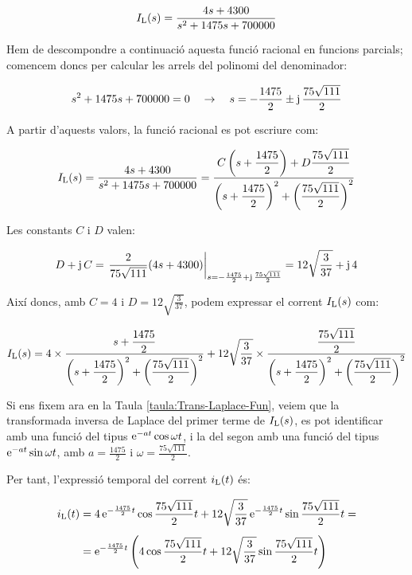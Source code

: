 \begin{exemple}
    \[
    I_\mathrm{L}(s) = \frac{4 s+ 4300}{s^2 +1475 s + 700000}
    \]

    Hem de descompondre a continuació aquesta funció racional en
    funcions parcials; comencem doncs per calcular les arrels del
    polinomi del denominador:

    \[
    s^2 +1475 s + 700000 = 0 \quad\rightarrow\quad s= -\frac{1475}{2}
    \pm \mathrm{j}\,\frac{75\sqrt{111}}{2}
    \]

    A partir d'aquests valors, la  funció racional es pot escriure com:

    \[
        I_\mathrm{L}(s) =
        \frac{4 s+ 4300}{s^2 +1475 s + 700000} =
        \frac{C\left(s+\dfrac{1475}{2}\right)+D\dfrac{75\sqrt{111}}{2}}
        {\left(s+\dfrac{1475}{2}\right)^2+\left(\dfrac{75\sqrt{111}}{2}\right)^2}
    \]

    Les constants $C$ i $D$ valen:

    \[
    D + \mathrm{j}\,C = \left.\frac{2}{75\sqrt{111}}(4 s
    +4300)\right|_{s=-\frac{1475}{2} + \mathrm{j}\,\frac{75\sqrt{111}}{2}}=
    12\sqrt{\frac{3}{37}} +\mathrm{j}\,4
    \]

    Així doncs, amb $C=4$ i $D=12\sqrt{\frac{3}{37}}$, podem expressar
    el corrent $I_\mathrm{L}(s)$ com:

    \[
        I_\mathrm{L}(s) = 4\times\frac{s+\dfrac{1475}{2}}
        {\left(s+\dfrac{1475}{2}\right)^2+\left(\dfrac{75\sqrt{111}}{2}\right)^2}
        + 12\sqrt{\frac{3}{37}}\times\frac{\dfrac{75\sqrt{111}}{2}}
        {\left(s+\dfrac{1475}{2}\right)^2+\left(\dfrac{75\sqrt{111}}{2}\right)^2}
    \]


     Si ens fixem ara en la Taula \vref{taula:Trans-Laplace-Fun},
    veiem que la transformada inversa de Laplace del primer terme de
    $I_\mathrm{L}(s)$, es pot identificar amb una funció del tipus
    $\mathrm{e}^{-at}\cos\omega t$, i la del segon amb una funció del tipus
    $\mathrm{e}^{-at}\sin\omega t$, amb $a=\frac{1475}{2}$ i
    $\omega=\frac{75\sqrt{111}}{2}$.

    Per tant, l'expressió temporal del corrent $i_\mathrm{L}(t)$ és:

    \[\begin{split}
        i_\mathrm{L}(t) &= 4\, \mathrm{e}^{-\frac{1475}{2}t} \cos \frac{75\sqrt{111}}{2} t +
        12\sqrt{\frac{3}{37}}\, \mathrm{e}^{-\frac{1475}{2}t} \sin
        \frac{75\sqrt{111}}{2}t = \\[1ex] &= \mathrm{e}^{-\frac{1475}{2}t} \left( 4
        \cos \frac{75\sqrt{111}}{2} t + 12\sqrt{\frac{3}{37}}\sin
        \frac{75\sqrt{111}}{2}t\right)
    \end{split}\]


\end{exemple}
